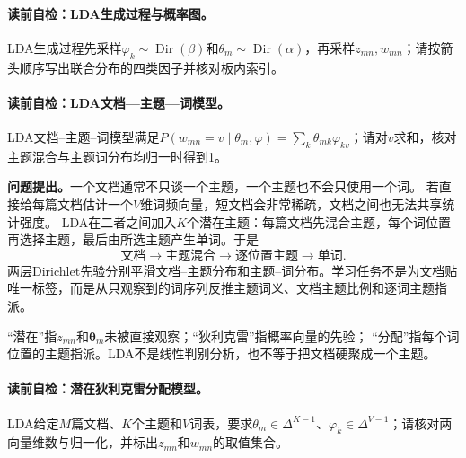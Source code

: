 \paragraph{读前自检：LDA生成过程与概率图。}LDA生成过程先采样$\varphi_k\sim\operatorname{Dir}(\beta)$和$\theta_m\sim\operatorname{Dir}(\alpha)$，再采样$z_{mn},w_{mn}$；请按箭头顺序写出联合分布的四类因子并核对板内索引。\par
\paragraph{读前自检：LDA文档—主题—词模型。}LDA文档--主题--词模型满足$P(w_{mn}=v\mid\theta_m,\varphi)=\sum_k\theta_{mk}\varphi_{kv}$；请对$v$求和，核对主题混合与主题词分布均归一时得到1。\par


\label{struct:V5-C06-CH06}
\textbf{问题提出。}一个文档通常不只谈一个主题，一个主题也不会只使用一个词。
若直接给每篇文档估计一个$V$维词频向量，短文档会非常稀疏，文档之间也无法共享统计强度。
LDA在二者之间加入$K$个潜在主题：每篇文档先混合主题，每个词位置再选择主题，最后由所选主题产生单词。于是
\[
\text{文档}\longrightarrow\text{主题混合}\longrightarrow
\text{逐位置主题}\longrightarrow\text{单词}.
\]
两层Dirichlet先验分别平滑文档--主题分布和主题--词分布。学习任务不是为文档贴唯一标签，而是从只观察到的词序列反推主题词义、文档主题比例和逐词主题指派。

\begin{notationbox}
“潜在”指$z_{mn}$和$\boldsymbol\theta_m$未被直接观察；“狄利克雷”指概率向量的先验；
“分配”指每个词位置的主题指派。LDA不是线性判别分析，也不等于把文档硬聚成一个主题。
\end{notationbox}


\label{struct:V5-C06-CH07}
\paragraph{读前自检：潜在狄利克雷分配模型。}LDA给定$M$篇文档、$K$个主题和$V$词表，要求$\theta_m\in\Delta^{K-1}$、$\varphi_k\in\Delta^{V-1}$；请核对两向量维数与归一化，并标出$z_{mn}$和$w_{mn}$的取值集合。\par

